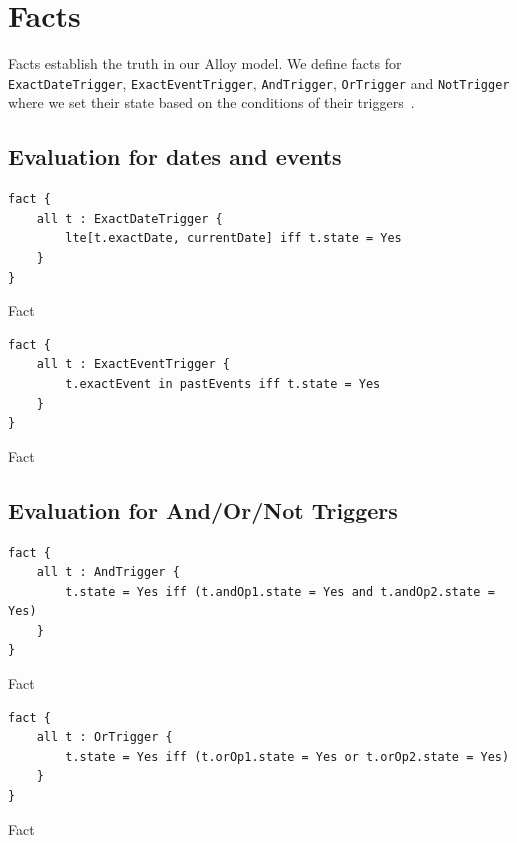\section{Facts}

Facts establish the truth in our Alloy model. We define facts for \verb|ExactDateTrigger|, \verb|ExactEventTrigger|, \verb|AndTrigger|, \verb|OrTrigger| and \verb|NotTrigger| where we set their state based on the conditions of their triggers~.

\subsection{Evaluation for dates and events}

\begin{listing}[H]\label{list:vs:fact-exact-date-trigger-eval}
	\begin{verbatim}
fact {
	all t : ExactDateTrigger {
		lte[t.exactDate, currentDate] iff t.state = Yes
	}
}
\end{verbatim}
	\caption{Fact}
\end{listing}

\begin{listing}[H]\label{fig:vs:fact-exact-event-trigger-eval}
	\begin{verbatim}
fact {
	all t : ExactEventTrigger {
		t.exactEvent in pastEvents iff t.state = Yes
	}
}
\end{verbatim}
	\caption{Fact}
\end{listing}

\subsection{Evaluation for And/Or/Not Triggers}

\begin{listing}[H]\label{fig:vs:fact-and-trigger-eval}
	\begin{verbatim}
fact {
	all t : AndTrigger {
		t.state = Yes iff (t.andOp1.state = Yes and t.andOp2.state = Yes)
	}
}
\end{verbatim}
	\caption{Fact}
\end{listing}

\begin{listing}[H]\label{fig:vs:fact-or-trigger-eval}
	\begin{verbatim}
fact {
	all t : OrTrigger {
		t.state = Yes iff (t.orOp1.state = Yes or t.orOp2.state = Yes)
	}
}
\end{verbatim}
	\caption{Fact}
\end{listing}

